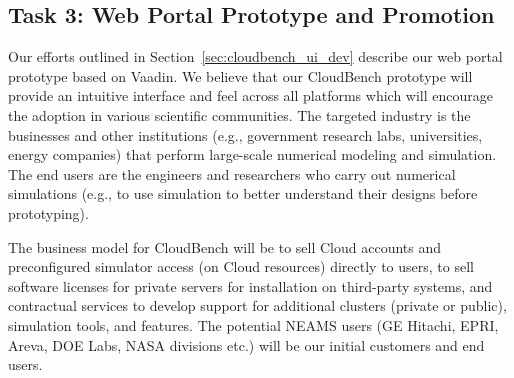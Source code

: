 \subsection{Task 3: Web Portal Prototype and Promotion}
Our efforts outlined in Section~\ref{sec:cloudbench_ui_dev} describe our web 
portal prototype based on Vaadin. We believe that our CloudBench prototype will 
provide an intuitive interface and feel across all platforms which will 
encourage the adoption in various scientific communities. The targeted industry 
is the businesses and other institutions (e.g., government research labs, 
universities, energy companies) that perform large-scale numerical modeling and 
simulation. The end users are the engineers and researchers who carry out 
numerical simulations (e.g., to use simulation to better understand their 
designs before prototyping).

The business model for CloudBench will be to sell Cloud accounts and 
preconfigured simulator access (on Cloud resources) directly to users, to sell 
software licenses for private servers for installation on third-party systems, 
and contractual services to develop support for additional clusters (private or 
public), simulation tools, and features. The potential NEAMS users (GE Hitachi, 
EPRI, Areva, DOE Labs, NASA divisions etc.) will be our initial customers and 
end users.

